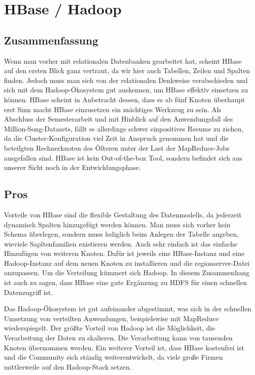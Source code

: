 \section{HBase / Hadoop}
\subsection{Zusammenfassung}
Wenn man vorher mit relationalen Datenbanken gearbeitet hat, scheint HBase auf den ersten Blick ganz vertraut, da wir hier auch Tabellen, Zeilen und Spalten finden. Jedoch muss man sich von der relationalen Denkweise verabschieden und sich mit dem Hadoop-Ökosystem gut auskennen, um HBase effektiv einsetzen zu können. HBase scheint in Anbetracht dessen, dass es ab fünf Knoten überhaupt erst Sinn macht HBase einzusetzen ein mächtiges Werkzeug zu sein. Als Abschluss der Semesterarbeit und mit Hinblick auf den Anwendungsfall des Million-Song-Datasets, fällt es allerdings schwer einpositives Resume zu ziehen, da die Cluster-Konfiguration viel Zeit in Anspruch genommen hat und die beteilgten Rechnerknoten des Öfteren unter der Last der MapReduce-Jobs ausgefallen sind. HBase ist kein Out-of-the-box Tool, sondern befindet sich aus unserer Sicht noch in der Entwicklungsphase.

\subsection{Pros}
Vorteile von HBase sind die flexible Gestaltung des Datenmodells, da jederzeit dynamisch Spalten hinzugefügt werden können. Man muss sich vorher kein Schema überlegen, sondern muss lediglich beim Anlegen der Tabelle angeben, wieviele Sapltenfamilien existieren werden. Auch sehr einfach ist das einfache Hinzufügen von weiteren Knoten. Dafür ist jeweils eine HBase-Instanz und eine Hadoop-Instanz auf dem neuen Knoten zu installieren und die regionserver-Datei anzupassen. Um die Verteilung kümmert sich Hadoop. In diesem Zusammenhang ist auch zu sagen, dass HBase eine gute Ergänzung zu \ac{HDFS} für einen schnellen Datenzugriff ist.

Das Hadoop-Ökosystem ist gut aufeinander abgestimmt, was sich in der schnellen Umsetzung von verteilten Anwendungen, beispielswise mit MapReduce wiederspiegelt.
Der größte Vorteil von Hadoop ist die Möglichkeit, die Verarbeitung der Daten zu skalieren. Die Verarbeitung kann von tausenden Knoten übernommen werden. Ein weiterer Vorteil ist, dass HBase kostenfrei ist und die Community sich ständig weiterentwickelt, da viele große Firmen mittlerweile auf den Hadoop-Stack setzen. 

